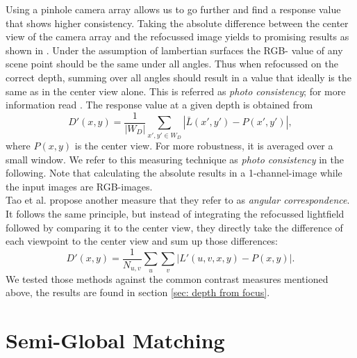 \documentclass  [
  paper    = a4,
  BCOR     = 10mm,
  twoside,
  fontsize = 12pt,
  fleqn,
  toc      = bibnumbered,
  toc      = listofnumbered,
  numbers  = noendperiod,
  headings = normal,
  listof   = leveldown,
  version  = 3.03
]                                       {scrreprt}
\begin{document}
Using a pinhole camera array allows us to go further and find a response value that shows higher consistency. Taking the absolute difference between the center view of the camera array and the refocussed image yields to promising results as shown in \cite{tao2017shape}. Under the assumption of lambertian surfaces the RGB- value of any scene point should be the same under all angles. Thus when refocussed on the correct depth, summing over all angles should result in a value that ideally is the same as in the center view alone. This is referred as \textit{photo consistency}; for more information read \cite{tao2017shape}.
The response value at a given depth is obtained from
\begin{equation}\label{key}
D'(x,y) = \frac{1}{|W_D|}\sum_{x',y' \in W_D} \left|\bar{L}(x',y')- P(x', y')\right|,
\end{equation}
where $P(x,  y)$ is the center view. For more robustness, it is averaged over a small window. We refer to this measuring technique as \textit{photo consistency} in the following. Note that calculating the absolute results in a 1-channel-image while the input images are RGB-images. \\ Tao et al. propose another measure that they refer to as \textit{angular correspondence}. It follows the same principle, but instead of integrating the refocussed lightfield followed by comparing it to the center view, they directly take the difference of each viewpoint to the center view and sum up those differences:
\begin{equation}\label{eq:responsecorr}
D'(x,y) = \frac{1}{N_{u,v}}\sum_{u}\sum_{v}  \left|L'(u, v, x, y) - P(x,y)\right|.
\end{equation}
We tested those methods against the common contrast measures mentioned above, the results are found in section \ref{sec: depth from focus}.

\section{Semi-Global Matching}
\end{document}
